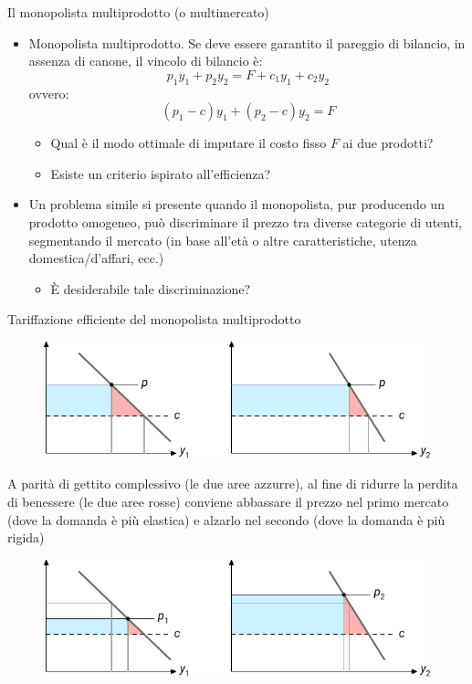 \documentclass[aspectratio=64,11pt]{beamer}
\begin{document}
\begin{frame}{Il monopolista multiprodotto (o multimercato)}
\begin{itemize}
\item Monopolista \alert{multiprodotto}. Se deve essere garantito il pareggio di bilancio, in
assenza di canone, il vincolo di bilancio è:
\begin{equation*}
 p_1y_1+p_2y_2=F+c_1y_1+c_2y_2
\end{equation*}
ovvero:
\begin{equation*}
 (p_1-c)y_1+(p_2-c)y_2=F
\end{equation*}
\begin{itemize}
\item Qual è il modo ottimale di imputare il costo fisso $F$ ai due prodotti?
\item Esiste un criterio ispirato all'efficienza?
\end{itemize}
\item Un problema simile si presente quando il monopolista, pur producendo un
prodotto omogeneo, può \alert{discriminare} il prezzo tra diverse categorie di
utenti, segmentando il mercato (in base all'età o altre caratteristiche,
utenza domestica/d'affari, ecc.)
\begin{itemize}
\item È desiderabile tale discriminazione?
\end{itemize}
\end{itemize}
\end{frame}

\begin{frame}{Tariffazione efficiente del monopolista multiprodotto}
\begin{figure}[htbp]
\centering
\includegraphics[width=.7\textwidth]{./figure/ramsey-1-color.pdf}
\end{figure}

A parità di gettito complessivo (le due aree azzurre), al fine di ridurre la perdita
di benessere (le due aree rosse) conviene abbassare il prezzo nel primo mercato (dove
la domanda è più elastica) e alzarlo nel secondo (dove la domanda è più
rigida)

\begin{figure}[htbp]
\centering
\includegraphics[width=.7\textwidth]{./figure/ramsey-2-color.pdf}
\end{figure}
\end{frame}
\end{document}
